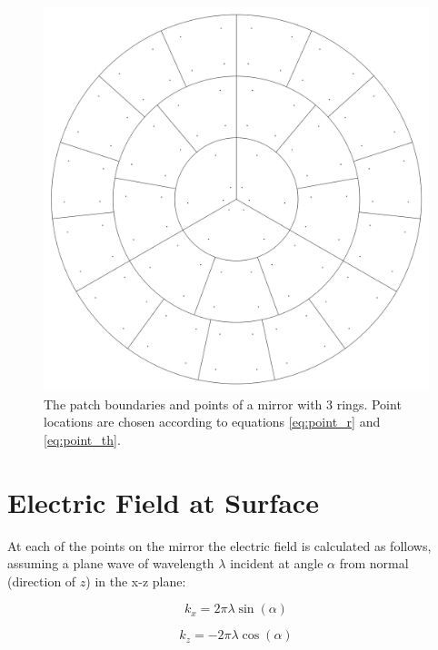 \documentclass[etd,senior,noacknowledgments]{BYUPhys}
\begin{document}
\begin{figure}
  \centerline{\includegraphics[width=\textwidth]{circular-grid-with-points}}
  \caption[Mirror patch boundaries and point locations]{\label{fig:patches_points}
    The patch boundaries and points of a mirror with 3 rings. Point locations are chosen according to equations \ref{eq:point_r} and \ref{eq:point_th}.}
\end{figure}



\section{Electric Field at Surface}\label{sec:efield}

At each of the points on the mirror the electric field is calculated as follows, assuming a plane wave of wavelength $\lambda$ incident at angle $\alpha$ from normal (direction of $z$) in the x-z plane:

\begin{equation}
  k_{x}=2\pi\lambda\sin\left(\alpha\right)
\end{equation}

\begin{equation}
  k_{z}=-2\pi\lambda\cos\left(\alpha\right)
\end{equation}
\end{document}
